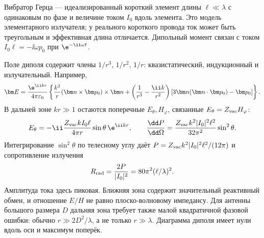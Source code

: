 
Вибратор Герца — идеализированный короткий элемент длины $\ell\ll\lambda$ с одинаковым по фазе и величине током $I_0$ вдоль элемента. Это модель элементарного излучателя; у реального короткого провода ток может быть треугольным и эффективная длина отличается. Дипольный момент связан с током $I_0\ell=-\ii\omega p_0$ при $\e^{-\ii\omega t}$.

Поле диполя содержит члены $1/r^3$, $1/r^2$, $1/r$: квазистатический, индукционный и излучательный. Например,
\begin{equation}
 \bm E=\frac{\e^{\ii kr}}{4\pi\varepsilon_0}
 \left\{\frac{k^2}{r}(\bm n\times\bm p_0)\times\bm n+
 \left(\frac1{r^3}-\frac{\ii k}{r^2}\right)[3\bm n(\bm n\cdot\bm p_0)-\bm p_0]\right\}.
\end{equation}
В дальней зоне $kr\gg1$ остаются поперечные $E_\theta,H_\varphi$, связанные $E_\theta=Z_{\rm vac}H_\varphi$:
\begin{equation}
 E_\theta=-\ii\frac{Z_{\rm vac}kI_0\ell}{4\pi r}\sin\theta\,\e^{\ii kr},
 \qquad \frac{\dd P}{\dd\Omega}=\frac{Z_{\rm vac}k^2|I_0|^2\ell^2}{32\pi^2}\sin^2\theta.
\end{equation}
Интегрирование $\sin^2\theta$ по телесному углу даёт $P=Z_{\rm vac}k^2|I_0|^2\ell^2/(12\pi)$ и сопротивление излучения
\begin{equation}
 R_{\rm rad}=\frac{2P}{|I_0|^2}=80\pi^2(\ell/\lambda)^2.
\end{equation}
Амплитуда тока здесь пиковая. Ближняя зона содержит значительный реактивный обмен, и отношение $E/H$ не равно плоско-волновому импедансу. Для антенны большого размера $D$ дальняя зона требует также малой квадратичной фазовой ошибки: обычно $r\gg2D^2/\lambda$, а не только $r\gg\lambda$. Диаграмма диполя имеет нули вдоль оси и максимум поперёк.

